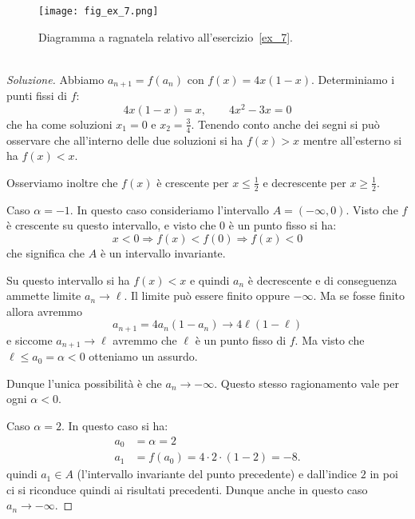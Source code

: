 \newsavebox{\qrexsette}
\begin{figure}
   \begin{center}
    \texttt{[image: fig\_ex\_7.png]}
  \end{center}
  \caption{Diagramma a ragnatela relativo
    all'esercizio~\ref{ex_7}.
    \ifwidemargin\\\\\fi%
    \usebox{\qrexsette}}
  \label{fig_ex_7}
\end{figure}

\begin{proof}[Soluzione]
  Abbiamo $a_{n+1} = f(a_n)$ con $f(x) = 4x(1-x)$. 
  Determiniamo i punti
  fissi di $f$:
  \[
  4x(1-x)= x, \qquad 4 x^2 - 3x = 0
  \]
  che ha come soluzioni $x_1=0$ e $x_2=\frac 3 4$. 
  Tenendo conto anche dei segni si può
  osservare che all'interno delle due soluzioni si ha $f(x)>x$ mentre
  all'esterno si ha $f(x)<x$.

  Osserviamo inoltre che $f(x)$ è crescente per
  $x\le \frac 1 2$ e decrescente per $x\ge \frac 1 2$.

  Caso $\alpha=-1$. In questo caso consideriamo l'intervallo
  $A=(-\infty, 0)$. Visto che $f$ è crescente su questo intervallo,
  e visto che $0$ è un punto fisso si ha:
  \[
  x < 0 \Rightarrow f(x) < f(0) \Rightarrow f(x) < 0
  \]
  che significa che $A$ è un intervallo invariante.

  Su questo intervallo si ha $f(x)<x$ e quindi $a_n$ è decrescente e
  di conseguenza ammette limite $a_n\to \ell$. Il limite può essere
  finito oppure $-\infty$. Ma se fosse finito allora avremmo
  \[
  a_{n+1} = 4 a_n (1-a_n) \to 4 \ell (1-\ell)
  \]
  e siccome $a_{n+1}\to \ell$ avremmo che $\ell$
  è un punto fisso di $f$. 
  Ma visto che $\ell \le a_0 = \alpha < 0$
  otteniamo un assurdo.

  Dunque l'unica possibilità è che $a_n \to -\infty$. Questo
  stesso ragionamento vale per ogni $\alpha<0$.

  Caso $\alpha=2$. In questo caso si ha:
  \begin{align*}
    a_0 &= \alpha = 2\\
    a_1 &= f(a_0) = 4\cdot 2\cdot (1-2) = -8.
  \end{align*}
  quindi $a_1 \in A$ (l'intervallo invariante del punto precedente) e
  dall'indice $2$ in poi ci si riconduce quindi ai risultati
  precedenti. Dunque anche in questo caso $a_n \to -\infty$.


\end{proof}
